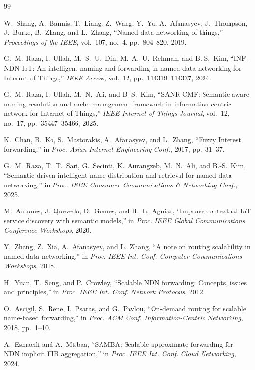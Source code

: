 \documentclass[journal]{IEEEtran}
\begin{document}
\balance
\begin{thebibliography}{99}

W.~Shang, A.~Bannis, T.~Liang, Z.~Wang, Y.~Yu, A.~Afanasyev, J.~Thompson, J.~Burke, B.~Zhang, and L.~Zhang,
``Named data networking of things,''
\emph{Proceedings of the IEEE}, vol.~107, no.~4, pp.~804--820, 2019.

G.~M.~Raza, I.~Ullah, M.~S.~U.~Din, M.~A.~U.~Rehman, and B.-S.~Kim,
``INF-NDN IoT: An intelligent naming and forwarding in named data networking for Internet of Things,''
\emph{IEEE Access}, vol.~12, pp.~114319--114337, 2024.

G.~M.~Raza, I.~Ullah, M.~N.~Ali, and B.-S.~Kim,
``SANR-CMF: Semantic-aware naming resolution and cache management framework in information-centric network for Internet of Things,''
\emph{IEEE Internet of Things Journal}, vol.~12, no.~17, pp.~35447--35466, 2025.

K.~Chan, B.~Ko, S.~Mastorakis, A.~Afanasyev, and L.~Zhang,
``Fuzzy Interest forwarding,''
in \emph{Proc. Asian Internet Engineering Conf.}, 2017, pp.~31--37.

G.~M.~Raza, T.~T.~Sari, G.~Secinti, K.~Aurangzeb, M.~N.~Ali, and B.-S.~Kim,
``Semantic-driven intelligent name distribution and retrieval for named data networking,''
in \emph{Proc. IEEE Consumer Communications \& Networking Conf.}, 2025.

M.~Antunes, J.~Quevedo, D.~Gomes, and R.~L.~Aguiar,
``Improve contextual IoT service discovery with semantic models,''
in \emph{Proc. IEEE Global Communications Conference Workshops}, 2020.

Y.~Zhang, Z.~Xia, A.~Afanasyev, and L.~Zhang,
``A note on routing scalability in named data networking,''
in \emph{Proc. IEEE Int. Conf. Computer Communications Workshops}, 2018.

H.~Yuan, T.~Song, and P.~Crowley,
``Scalable NDN forwarding: Concepts, issues and principles,''
in \emph{Proc. IEEE Int. Conf. Network Protocols}, 2012.

O.~Ascigil, S.~Rene, I.~Psaras, and G.~Pavlou,
``On-demand routing for scalable name-based forwarding,''
in \emph{Proc. ACM Conf. Information-Centric Networking}, 2018, pp.~1--10.

A.~Esmaeili and A.~Mtibaa,
``SAMBA: Scalable approximate forwarding for NDN implicit FIB aggregation,''
in \emph{Proc. IEEE Int. Conf. Cloud Networking}, 2024.


\end{thebibliography}
\end{document}
